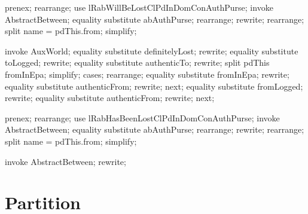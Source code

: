 %
\begin{LDCheck}\begin{zproof}
    prenex;
    rearrange;
    use lRabWillBeLostClPdInDomConAuthPurse;
    invoke AbstractBetween;
    equality substitute \dom abAuthPurse;
    rearrange;
    rewrite;
    rearrange;
    split name = pdThis.from;
    simplify;
\end{zproof}\end{LDCheck}

\begin{LPScript}\begin{zproof}[lRabHasBeenLostClPdInDomConAuthPurse]
    invoke AuxWorld;
    equality substitute definitelyLost;
    rewrite;
    equality substitute toLogged;
    rewrite;
    equality substitute authenticTo;
    rewrite;
    split pdThis \in fromInEpa;
    simplify;
    cases;
    rearrange;
    equality substitute fromInEpa;
    rewrite;
    equality substitute authenticFrom;
    rewrite;
    next;
    equality substitute fromLogged;
    rewrite;
    equality substitute authenticFrom;
    rewrite;
    next;
\end{zproof}\end{LPScript}

\begin{LDCheck}\begin{zproof}
    prenex;
    rearrange;
    use lRabHasBeenLostClPdInDomConAuthPurse;
    invoke AbstractBetween;
    equality substitute \dom abAuthPurse;
    rearrange;
    rewrite;
    rearrange;
    split name = pdThis.from;
    simplify;
\end{zproof}\end{LDCheck}

\begin{LDCheck}\begin{zproof}
    invoke AbstractBetween;
    rewrite;
\end{zproof}\end{LDCheck}

\section{Partition}

